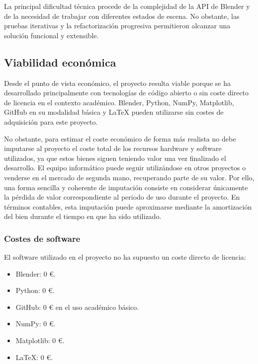 La principal dificultad técnica procede de la complejidad de la API de Blender y de la necesidad de trabajar con diferentes estados de escena. No obstante, las pruebas iterativas y la refactorización progresiva permitieron alcanzar una solución funcional y extensible.

\subsection{Viabilidad económica}
\label{subsec:a-viabilidad-economica}

Desde el punto de vista económico, el proyecto resulta viable porque se ha desarrollado principalmente con tecnologías de código abierto o sin coste directo de licencia en el contexto académico. Blender, Python, NumPy, Matplotlib, GitHub en su modalidad básica y \LaTeX{} pueden utilizarse sin costes de adquisición para este proyecto.

No obstante, para estimar el coste económico de forma más realista no debe imputarse al proyecto el coste total de los recursos hardware y software utilizados, ya que estos bienes siguen teniendo valor una vez finalizado el desarrollo. El equipo informático puede seguir utilizándose en otros proyectos o venderse en el mercado de segunda mano, recuperando parte de su valor. Por ello, una forma sencilla y coherente de imputación consiste en considerar únicamente la pérdida de valor correspondiente al periodo de uso durante el proyecto. En términos contables, esta imputación puede aproximarse mediante la amortización del bien durante el tiempo en que ha sido utilizado.

\subsubsection{Costes de software}
\label{subsubsec:a-costes-software}

El software utilizado en el proyecto no ha supuesto un coste directo de licencia:

\begin{itemize}
\item Blender: 0 €.
\item Python: 0 €.
\item GitHub: 0 € en el uso académico básico.
\item NumPy: 0 €.
\item Matplotlib: 0 €.
\item \LaTeX: 0 €.
\end{itemize}

